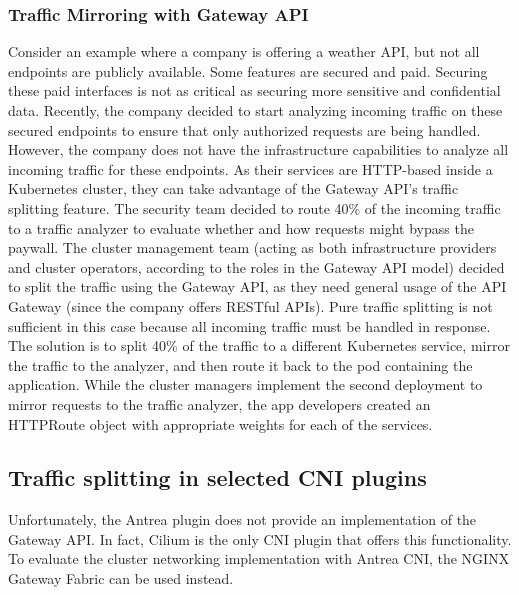 
\subsubsection{Traffic Mirroring with Gateway API}
\label{subsubsection:mirroring}

Consider an example where a company is offering a weather API, but not all endpoints are publicly available. Some features are secured and paid. Securing these paid interfaces is not as critical as securing more sensitive and confidential data. Recently, the company decided to start analyzing incoming traffic on these secured endpoints to ensure that only authorized requests are being handled. However, the company does not have the infrastructure capabilities to analyze all incoming traffic for these endpoints. As their services are HTTP-based inside a Kubernetes cluster, they can take advantage of the Gateway API’s traffic splitting feature. The security team decided to route 40\% of the incoming traffic to a traffic analyzer to evaluate whether and how requests might bypass the paywall. The cluster management team (acting as both infrastructure providers and cluster operators, according to the roles in the Gateway API model) decided to split the traffic using the Gateway API, as they need general usage of the API Gateway (since the company offers RESTful APIs). Pure traffic splitting is not sufficient in this case because all incoming traffic must be handled in response. The solution is to split 40\% of the traffic to a different Kubernetes service, mirror the traffic to the analyzer, and then route it back to the pod containing the application. While the cluster managers implement the second deployment to mirror requests to the traffic analyzer, the app developers created an HTTPRoute object with appropriate weights for each of the services.


\subsection{Traffic splitting in selected CNI plugins}
\label{subsection:trafficSplitting}

Unfortunately, the Antrea plugin does not provide an implementation of the Gateway API. In fact, Cilium is the only CNI plugin that offers this functionality. To evaluate the cluster networking implementation with Antrea CNI, the NGINX Gateway Fabric can be used instead.



